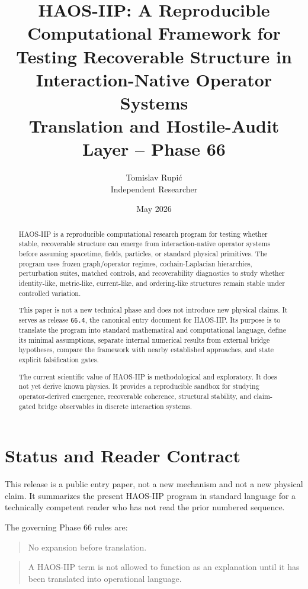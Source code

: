 \documentclass[11pt]{article}
\title{HAOS-IIP: A Reproducible Computational Framework for Testing Recoverable Structure in Interaction-Native Operator Systems\\[0.5em]\large Translation and Hostile-Audit Layer -- Phase 66}
\author{Tomislav Rupi\'c \\ Independent Researcher}
\date{May 2026}
\begin{document}
\maketitle

\begin{abstract}
HAOS-IIP is a reproducible computational research program for testing whether stable, recoverable structure can emerge from interaction-native operator systems before assuming spacetime, fields, particles, or standard physical primitives. The program uses frozen graph/operator regimes, cochain-Laplacian hierarchies, perturbation suites, matched controls, and recoverability diagnostics to study whether identity-like, metric-like, current-like, and ordering-like structures remain stable under controlled variation.

This paper is not a new technical phase and does not introduce new physical claims. It serves as release \texttt{66.4}, the canonical entry document for HAOS-IIP. Its purpose is to translate the program into standard mathematical and computational language, define its minimal assumptions, separate internal numerical results from external bridge hypotheses, compare the framework with nearby established approaches, and state explicit falsification gates.

The current scientific value of HAOS-IIP is methodological and exploratory. It does not yet derive known physics. It provides a reproducible sandbox for studying operator-derived emergence, recoverable coherence, structural stability, and claim-gated bridge observables in discrete interaction systems.
\end{abstract}

\tableofcontents

\section{Status and Reader Contract}

This release is a public entry paper, not a new mechanism and not a new physical claim. It summarizes the present HAOS-IIP program in standard language for a technically competent reader who has not read the prior numbered sequence.

The governing Phase 66 rules are:

\begin{quote}
No expansion before translation.
\end{quote}

\begin{quote}
A HAOS-IIP term is not allowed to function as an explanation until it has been translated into operational language.
\end{quote}
\end{document}
